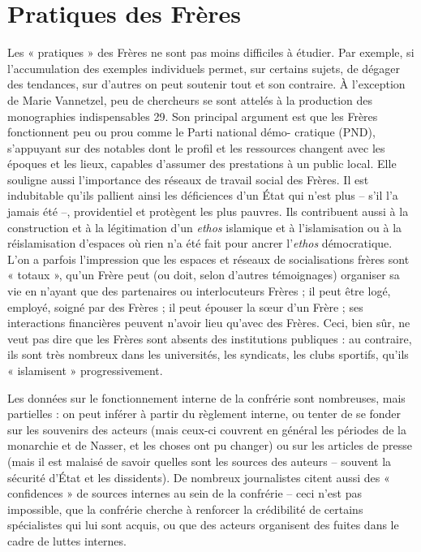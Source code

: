 \hypertarget{pratiques-des-fruxe8res}{%
\section{Pratiques des Frères}\label{pratiques-des-fruxe8res}}

 
Les « pratiques » des Frères ne sont pas moins difficiles à étudier. Par
exemple, si l'accumulation des exemples individuels permet, sur certains
sujets, de dégager des tendances, sur d'autres on peut soutenir tout et
son contraire. À l'exception de Marie Vannetzel, peu de chercheurs se
sont attelés à la production des monographies indispensables 29. Son
principal argument est que les Frères fonctionnent peu ou prou comme le
Parti national démo- cratique (PND), s'appuyant sur des notables dont le
profil et les ressources changent avec les époques et les lieux,
capables d'assumer des prestations à un public local. Elle souligne
aussi l'importance des réseaux de travail social des Frères. Il est
indubitable qu'ils pallient ainsi les déficiences d'un État qui n'est
plus -- s'il l'a jamais été --, providentiel et protègent les plus
pauvres. Ils contribuent aussi à la construction et à la légitimation
d'un \emph{ethos} islamique et à l'islamisation ou à la réislamisation
d'espaces où rien n'a été fait pour ancrer l'\emph{ethos} démocratique.
L'on a parfois l'impression que les espaces et réseaux de socialisations
frères sont « totaux », qu'un Frère peut (ou doit, selon d'autres
témoignages) organiser sa vie en n'ayant que des partenaires ou
interlocuteurs Frères ; il peut être logé, employé, soigné par des
Frères ; il peut épouser la sœur d'un Frère ; ses interactions
financières peuvent n'avoir lieu qu'avec des Frères. Ceci, bien sûr, ne
veut pas dire que les Frères sont absents des institutions publiques :
au contraire, ils sont très nombreux dans les universités, les
syndicats, les clubs sportifs, qu'ils « islamisent » progressivement.

Les données sur le fonctionnement interne de la confrérie sont
nombreuses,
mais partielles : on peut inférer à partir du règlement interne, ou
tenter de se fonder sur les souvenirs des acteurs (mais ceux-ci couvrent
en général les périodes de la monarchie et de Nasser, et les choses ont
pu changer) ou sur les articles de presse (mais il est malaisé de savoir
quelles sont les sources des auteurs -- souvent la sécurité d'État et
les dissidents). De nombreux journalistes citent aussi des « confidences
» de sources internes au sein de la confrérie -- ceci n'est pas
impossible, que la confrérie cherche à renforcer la crédibilité de
certains spécialistes qui lui sont acquis, ou que des acteurs organisent
des fuites dans le cadre de luttes internes.
 

